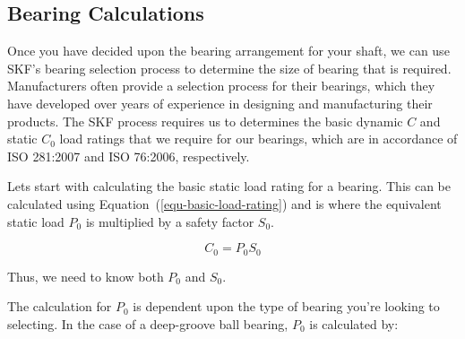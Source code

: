 







\subsection{Bearing Calculations} 

Once you have decided upon the bearing arrangement for your shaft, we can use SKF's bearing selection process to determine the size of bearing that is required. Manufacturers often provide a selection process for their bearings, which they have developed over years of experience in designing and manufacturing their products. The SKF process requires us to determines the basic dynamic \(C\) and static \(C_0\) load ratings that we require for our bearings, which are in accordance of ISO 281:2007 and ISO 76:2006, respectively.


Lets  start with calculating the basic static load rating for a bearing. This can be calculated using Equation~(\ref{equ-basic-load-rating}) and is where the equivalent static load \(P_0\) is multiplied by a safety factor \(S_0\).

\begin{equation}
  C_0 = P_0 S_0
  \label{equ-basic-load-rating}
\end{equation}

Thus, we need to know both \(P_0\) and \(S_0\).

The calculation for \(P_0\) is dependent upon the type of bearing you're looking to selecting. In the case of a deep-groove ball bearing, \(P_0\) is calculated by:

